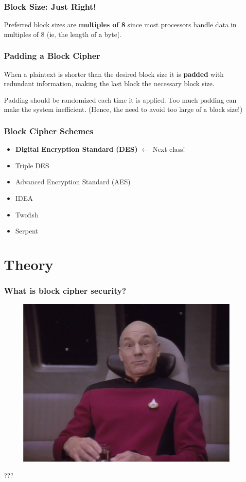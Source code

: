 \documentclass{beamer}
\newcommand{\<}{\langle}
\renewcommand{\>}{\rangle}
\begin{document}
\begin{frame}
\frametitle{Block Size: Just Right!}

Preferred block sizes are \textbf{multiples of 8} since most processors handle data in multiples of 8 (ie, the length of a byte).
\end{frame}


\begin{frame}
\frametitle{Padding a Block Cipher}

When a plaintext is shorter than the desired block size it is \textbf{padded} with redundant information, making the last block the necessary block size. \newline

Padding should be randomized each time it is applied. Too much padding can make the system inefficient. (Hence, the need to avoid too large of a block size!)
\end{frame}

\begin{frame}
\frametitle{Block Cipher Schemes}

\begin{itemize}
\item {\color{red}\textbf{Digital Encryption Standard (DES)}} {\scriptsize $\leftarrow$ Next class!}
\item Triple DES
\item Advanced Encryption Standard (AES)
\item IDEA
\item Twofish
\item Serpent
\end{itemize}
\end{frame}

\section{Theory}

\begin{frame}
\frametitle{What is block cipher security?}

\begin{figure}
\includegraphics[scale=.3]{IMG/confused.jpg}
\end{figure}\centering
???
\end{frame}
\end{document}
